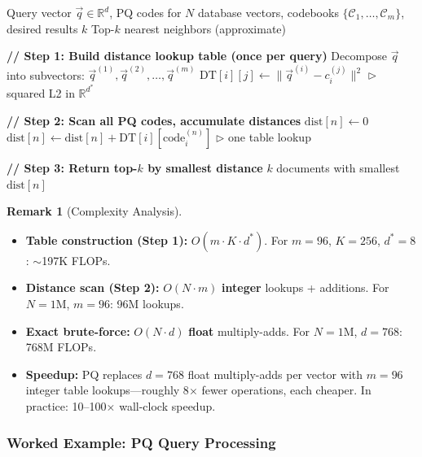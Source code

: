 \documentclass[11pt,a4paper]{article}
\theoremstyle{definition}
\newtheorem{remark}{Remark}[section]
\theoremstyle{plain}
\begin{document}
\begin{algorithm}[H]
\caption{PQ Query Processing (Asymmetric Distance Computation)}
\label{alg:pq-query}
\begin{algorithmic}[1]
\REQUIRE Query vector $\vec{q} \in \mathbb{R}^d$, PQ codes for $N$ database vectors, codebooks $\{\mathcal{C}_1, \ldots, \mathcal{C}_m\}$, desired results $k$
\ENSURE Top-$k$ nearest neighbors (approximate)

\medskip
\STATE \textbf{// Step 1: Build distance lookup table (once per query)}
\STATE Decompose $\vec{q}$ into subvectors: $\vec{q}^{(1)}, \vec{q}^{(2)}, \ldots, \vec{q}^{(m)}$
        \STATE $\mathrm{DT}[i][j] \gets \|\vec{q}^{(i)} - c_i^{(j)}\|^2$ \hfill $\triangleright$ squared L2 in $\mathbb{R}^{d^*}$
    \ENDFOR
\ENDFOR

\medskip
\STATE \textbf{// Step 2: Scan all PQ codes, accumulate distances}
    \STATE $\mathrm{dist}[n] \gets 0$
        \STATE $\mathrm{dist}[n] \gets \mathrm{dist}[n] + \mathrm{DT}[i][\mathrm{code}_i^{(n)}]$ \hfill $\triangleright$ one table lookup
    \ENDFOR
\ENDFOR

\medskip
\STATE \textbf{// Step 3: Return top-$k$ by smallest distance}
\RETURN $k$ documents with smallest $\mathrm{dist}[n]$
\end{algorithmic}
\end{algorithm}

\begin{remark}[Complexity Analysis]
\leavevmode
\begin{itemize}[nosep]
    \item \textbf{Table construction (Step 1):} $O(m \cdot K \cdot d^*)$. For $m=96$, $K=256$, $d^*=8$: $\sim$197K FLOPs.
    \item \textbf{Distance scan (Step 2):} $O(N \cdot m)$ \textbf{integer} lookups + additions. For $N = 1\text{M}$, $m = 96$: 96M lookups.
    \item \textbf{Exact brute-force:} $O(N \cdot d)$ \textbf{float} multiply-adds. For $N = 1\text{M}$, $d = 768$: 768M FLOPs.
    \item \textbf{Speedup:} PQ replaces $d = 768$ float multiply-adds per vector with $m = 96$ integer table lookups---roughly 8$\times$ fewer operations, each cheaper. In practice: 10--100$\times$ wall-clock speedup.
\end{itemize}
\end{remark}

\subsubsection{Worked Example: PQ Query Processing}
\end{document}
